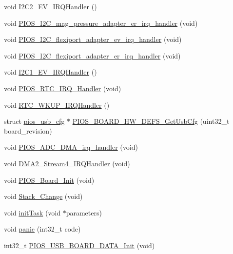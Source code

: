 \begin{DoxyCompactItemize}
void \hyperlink{group___freedom_gaa32a80208798d6132876a58823ff6202}{\-I2\-C2\-\_\-\-E\-V\-\_\-\-I\-R\-Q\-Handler} ()
\item 
void \hyperlink{group___freedom_ga2e3548269efcf5e015d952b7f69b67c1}{\-P\-I\-O\-S\-\_\-\-I2\-C\-\_\-mag\-\_\-pressure\-\_\-adapter\-\_\-er\-\_\-irq\-\_\-handler} (void)
\item 
void \hyperlink{group___freedom_ga0b5322143194be1bdf24d9cc88ca275e}{\-P\-I\-O\-S\-\_\-\-I2\-C\-\_\-flexiport\-\_\-adapter\-\_\-ev\-\_\-irq\-\_\-handler} (void)
\item 
void \hyperlink{group___freedom_ga7ae5d4453562364b12d1a9a55c2c9717}{\-P\-I\-O\-S\-\_\-\-I2\-C\-\_\-flexiport\-\_\-adapter\-\_\-er\-\_\-irq\-\_\-handler} (void)
\item 
void \hyperlink{group___freedom_gad0e17b57fe51ed2861178f06899345c0}{\-I2\-C1\-\_\-\-E\-V\-\_\-\-I\-R\-Q\-Handler} ()
\item 
void \hyperlink{group___freedom_gadc73bf2eccd9d9ff9d8efedd1e743704}{\-P\-I\-O\-S\-\_\-\-R\-T\-C\-\_\-\-I\-R\-Q\-\_\-\-Handler} (void)
\item 
void \hyperlink{group___freedom_ga7e78266985c97f3b7e8a9f91893657d1}{\-R\-T\-C\-\_\-\-W\-K\-U\-P\-\_\-\-I\-R\-Q\-Handler} ()
\item 
struct \hyperlink{structpios__usb__cfg}{pios\-\_\-usb\-\_\-cfg} $\ast$ \hyperlink{group___freedom_ga9075152ece4596f99329ba0bc3866dc9}{\-P\-I\-O\-S\-\_\-\-B\-O\-A\-R\-D\-\_\-\-H\-W\-\_\-\-D\-E\-F\-S\-\_\-\-Get\-Usb\-Cfg} (uint32\-\_\-t board\-\_\-revision)
\item 
void \hyperlink{group___freedom_gab621a081e0e0e8fa9499d7163dcc5a0e}{\-P\-I\-O\-S\-\_\-\-A\-D\-C\-\_\-\-D\-M\-A\-\_\-irq\-\_\-handler} (void)
\item 
void \hyperlink{group___freedom_ga295198ed574625d416158a5fc54205ea}{\-D\-M\-A2\-\_\-\-Stream4\-\_\-\-I\-R\-Q\-Handler} (void)
\item 
void \hyperlink{group___freedom_ga902009c5b1cb57d9f9d60092eb7cacfb}{\-P\-I\-O\-S\-\_\-\-Board\-\_\-\-Init} (void)
\item 
void \hyperlink{group___freedom_ga7a789e7b91612099a4a1f355b9e97c24}{\-Stack\-\_\-\-Change} (void)
\item 
void \hyperlink{group___freedom_gae7ecc4ed0ea5858477b78acaf928c3ef}{init\-Task} (void $\ast$parameters)
\item 
void \hyperlink{group___freedom_ga0e4330d8eb474f118a0acaff588a8c30}{panic} (int32\-\_\-t code)
\item 
int32\-\_\-t \hyperlink{group___freedom_ga5efd94ab761f254827f38dba474cf642}{\-P\-I\-O\-S\-\_\-\-U\-S\-B\-\_\-\-B\-O\-A\-R\-D\-\_\-\-D\-A\-T\-A\-\_\-\-Init} (void)
\end{DoxyCompactItemize}
